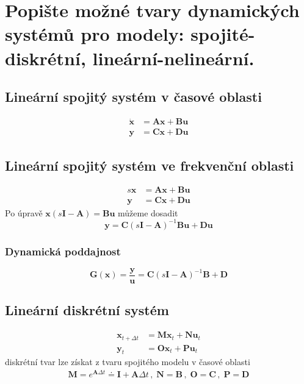 \documentclass{article}
\begin{document}
	\section{Popište možné tvary dynamických systémů pro modely: spojité-diskrétní, lineární-nelineární. }
	
	\subsection*{Lineární spojitý systém v časové oblasti}
	\begin{align*}
		\bm{\dot{x}} &= \bm{A}\bm{x} + \bm{B}\bm{u} \\
		\bm{y} &= \bm{C}\bm{x} + \bm{D}\bm{u}
	\end{align*}
	\subsection*{Lineární spojitý systém ve frekvenční oblasti}
	\begin{align*}
		s\bm{x} &= \bm{A}\bm{x} + \bm{B}\bm{u} \\
		\bm{y} &= \bm{C}\bm{x} + \bm{D}\bm{u}
	\end{align*}
	Po úpravě $\bm{x}(s\bm{I} - \bm{A}) = \bm{B}\bm{u}$ můžeme dosadit
	\begin{equation}
		\bm{y} = \bm{C}(s\bm{I}-\bm{A})^{-1}\bm{B}\bm{u}+\bm{D}\bm{u}
	\end{equation}
	\subsubsection*{Dynamická poddajnost}
	\begin{equation}
	\bm{G}(\bm{x}) = \frac{\bm{y}}{\bm{u}} = \bm{C}(s\bm{I}-\bm{A})^{-1}\bm{B}+\bm{D}
	\end{equation}
	\subsection*{Lineární diskrétní systém}
	\begin{align*}
		\bm{x}_{t+\Delta t} &= \bm{M}\bm{x}_t + \bm{N}\bm{u}_t \\
		\bm{y}_t &= \bm{O}\bm{x}_t + \bm{P}\bm{u}_t
	\end{align*}
	diskrétní tvar lze získat z tvaru spojitého modelu v časové oblasti
	\begin{align*}
		\bm{M} = e^{\bm{A}\Delta t} \doteq \bm{I} + \bm{A}\Delta t
		\,,\;
		\bm{N} = \bm{B}
		\,,\;
		\bm{O} = \bm{C}
		\,,\;
		\bm{P} = \bm{D}
	\end{align*}
\end{document}
